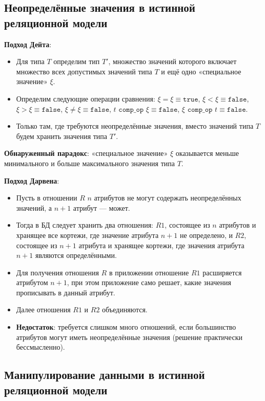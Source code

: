 \documentclass[a4paper,12pt]{article}
\begin{document}
\subsection{Неопределённые значения в истинной реляционной модели}

\textbf{Подход Дейта}:
\begin{itemize}
    \item Для типа $T$ определим тип $T'$, множество значений которого включает множество всех допустимых значений типа $T$ и ещё одно «специальное значение» $\xi$.
    \item Определим следующие операции сравнения: $\xi = \xi \equiv \texttt{true}$, $\xi < \xi \equiv \texttt{false}$, $\xi > \xi \equiv \texttt{false}$, $\xi \neq \xi \equiv \texttt{false}$, $t \texttt{ comp\_op } \xi \equiv \texttt{false}$, $\xi \texttt{ comp\_op } t \equiv \texttt{false}$.
    \item Только там, где требуются неопределённые значения, вместо значений типа $T$ будем хранить значения типа $T'$.
\end{itemize}

\textbf{Обнаруженный парадокс}: «специальное значение» $\xi$ оказывается меньше минимального и больше максимального значения типа $T$.

\textbf{Подход Дарвена}:
\begin{itemize}
    \item Пусть в отношении $R$ $n$ атрибутов не могут содержать неопределённых значений, а $n+1$ атрибут --- может.
    \item Тогда в БД следует хранить два отношения: $R1$, состоящее из $n$ атрибутов и хранящее все кортежи, где значение атрибута $n+1$ не определено, и $R2$, состоящее из $n+1$ атрибута и хранящее кортежи, где значения атрибута $n+1$ являются определёнными.
    \item Для получения отношения $R$ в приложении отношение $R1$ расширяется атрибутом $n+1$, при этом приложение само решает, какие значения прописывать в данный атрибут.
    \item Далее отношения $R1$ и $R2$ объединяются.
    \item \textbf{Недостаток}: требуется слишком много отношений, если большинство атрибутов могут иметь неопределённые значения (решение практически бессмысленно).
\end{itemize}

\subsection{Манипулирование данными в истинной реляционной модели}
\end{document}
